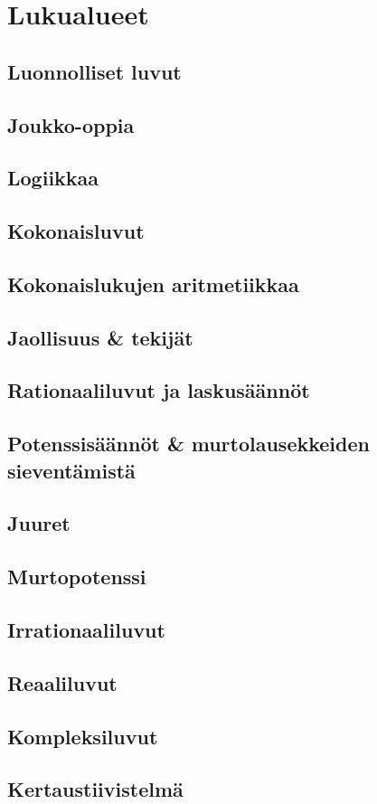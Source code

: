 


\part{Lukualueet}
\chapter{Luonnolliset luvut}
\chapter{Joukko-oppia}
\chapter{Logiikkaa}
\chapter{Kokonaisluvut}
\chapter{Kokonaislukujen aritmetiikkaa}
\chapter{Jaollisuus \& tekijät}
\chapter{Rationaaliluvut ja laskusäännöt}
\chapter{Potenssisäännöt \& murtolausekkeiden sieventämistä}
\chapter{Juuret}
\chapter{Murtopotenssi}
\chapter{Irrationaaliluvut}
\chapter{Reaaliluvut}
\chapter{Kompleksiluvut}
\chapter{Kertaustiivistelmä}
